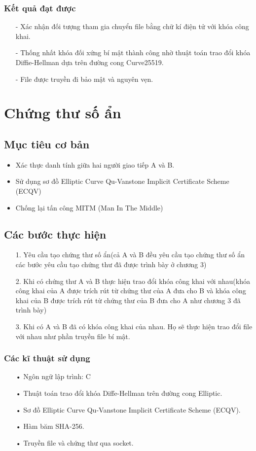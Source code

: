 \documentclass[a4paper,12pt]{report}
\begin{document}
\subsubsection*{Kết quả đạt được}
\begin{itemize}
\item[-] Xác nhận đối tượng tham gia chuyển file bằng chữ kí điện tử với khóa công khai.
\item[-] Thống nhất khóa đối xứng bí mật thành công nhờ thuật toán trao đổi khóa Diffie-Hellman dựa trên đường cong Curve25519.
\item[-] File được truyền đi bảo mật và nguyên vẹn.
\end{itemize}
\section{Chứng thư số ẩn}
\subsection*{Mục tiêu cơ bản}
\begin{itemize}
\item Xác thực danh tính giữa hai người giao tiếp A và B.
\item Sử dụng sơ đồ Elliptic Curve Qu-Vanstone Implicit Certificate Scheme (ECQV)
\item Chống lại tấn công MITM (Man In The Middle)
\end{itemize}
\subsection*{Các bước thực hiện}
\begin{itemize}
\item[1. ] Yêu cầu tạo chứng thư số ẩn(cả A và B đều yêu cầu tạo chứng thư số ẩn các bước yêu cầu tạo chứng thư đã được trình bày ở chương 3)
\item[2. ] Khi có chứng thư A và B thực hiện trao đổi khóa công khai với nhau(khóa công khai của A được trích rút từ chứng thư của A đưa cho B và khóa công khai của B được trích rút từ chứng thư của B đưa cho A như chương 3 đã trình bày)
\item[3. ] Khi có A và B đã có khóa công khai của nhau. Họ sẽ thực hiện trao đổi file với nhau như phần truyền file bí mật.
\end{itemize}
\subsubsection{Các kĩ thuật sử dụng}
\begin{itemize}
\item[•] Ngôn ngữ lập trình: C
\item[•] Thuật toán trao đổi khóa Diffe-Hellman trên đường cong Elliptic.
\item[•] Sơ đồ Elliptic Curve Qu-Vanstone Implicit Certificate Scheme (ECQV).
\item[•] Hàm băm SHA-256.
\item[•] Truyền file và chứng thư qua socket.
\end{itemize}
\end{document}

